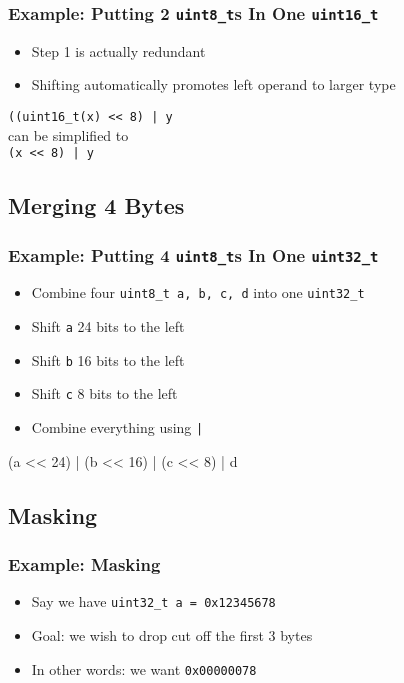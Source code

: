 \begin{frame}
  \frametitle{Example: Putting 2 \texttt{uint8\_t}s In One \texttt{uint16\_t}}
  \begin{itemize}
    \item Step 1 is actually redundant
    \item Shifting automatically promotes left operand to larger type
  \end{itemize}
  \begin{center}
    \texttt{((uint16\_t(x) << 8) | y} \\[4mm]
    can be simplified to \\[4mm]
    \texttt{(x << 8) | y}
  \end{center}
\end{frame}

\subsection{Merging 4 Bytes}
\frame{\tableofcontents[currentsubsection]}

\begin{frame}
  \frametitle{Example: Putting 4 \texttt{uint8\_t}s In One \texttt{uint32\_t}}
  \begin{itemize}
    \item Combine four \texttt{uint8\_t a, b, c, d} into one \texttt{uint32\_t}
    \item Shift \texttt{a} 24 bits to the left
    \item Shift \texttt{b} 16 bits to the left
    \item Shift \texttt{c} 8 bits to the left
    \item Combine everything using \texttt{|}
  \end{itemize}
  \begin{center} \ttfamily
    (a << 24) | (b << 16) | (c << 8) | d
  \end{center}
\end{frame}

\subsection{Masking}
\frame{\tableofcontents[currentsubsection]}

\begin{frame}
  \frametitle{Example: Masking}
  \begin{itemize}
    \item Say we have \texttt{uint32\_t a = 0x12345678}
    \item Goal: we wish to drop cut off the first 3 bytes
    \item In other words: we want \texttt{0x00000078}
  \end{itemize}
\end{frame}


